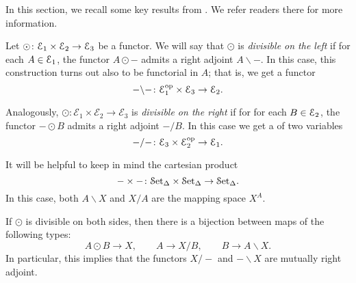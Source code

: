 \documentclass[main.tex]{subfiles}
\begin{document}
In this section, we recall some key results from \cite{qcats_vs_segal_spaces}. We refer readers there for more information.

Let $\odot\colon \mathcal{E}_{1} \times \mathcal{E}_{2} \to \mathcal{E}_{3}$ be a functor. We will say that $\odot$ is \emph{divisible on the left} if for each $A \in \mathcal{E}_{1}$, the functor $A \odot -$ admits a right adjoint $A \backslash -$. In this case, this construction turns out also to be functorial in $A$; that is, we get a functor
\begin{equation*}
  - \backslash -\colon \mathcal{E}_{1}^{\mathrm{op}} \times \mathcal{E}_{3} \to \mathcal{E}_{2}.
\end{equation*}

Analogously, $\odot\colon \mathcal{E}_{1} \times \mathcal{E}_{2} \to \mathcal{E}_{3}$ is \emph{divisible on the right} if for for each $B \in \mathcal{E}_{2}$, the functor $- \odot B$ admits a right adjoint $- / B$. In this case we get a of two variables
\begin{equation*}
  - / -\colon \mathcal{E}_{3} \times \mathcal{E}_{2}^{\mathrm{op}} \to \mathcal{E}_{1}.
\end{equation*}

\begin{example}
  It will be helpful to keep in mind the cartesian product 
  \begin{equation*}
    - \times -\colon \mathcal{S}\mathrm{et}_{\Delta} \times \mathcal{S}\mathrm{et}_{\Delta} \to \mathcal{S}\mathrm{et}_{\Delta}. 
  \end{equation*}
  In this case, both $A \backslash X$ and $X / A$ are the mapping space $X^{A}$.
\end{example}

If $\odot$ is divisible on both sides, then there is a bijection between maps of the following types:
\begin{equation*}
  A \odot B \to X,\qquad A \to X / B,\qquad B \to A \backslash X.
\end{equation*}
In particular, this implies that the functors $X / -$ and $- \backslash X$ are mutually right adjoint.
\end{document}
